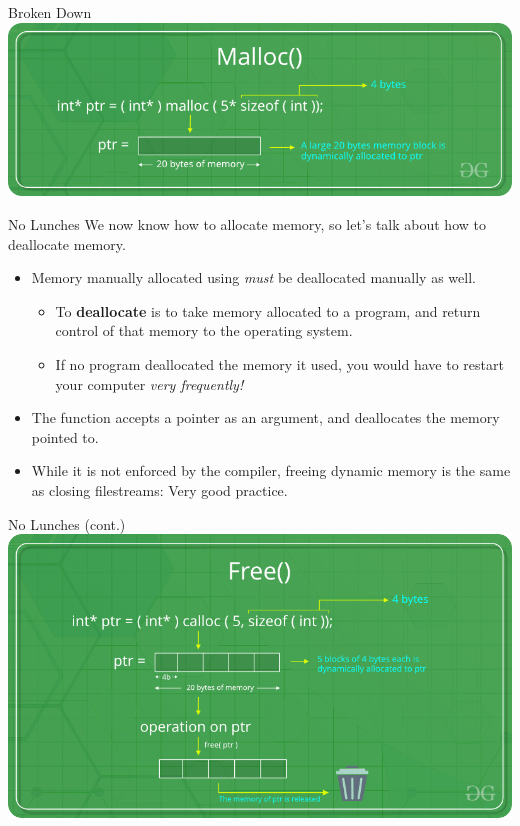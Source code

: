 \documentclass[11pt]{beamer}
\let\OldTexttt\texttt
\renewcommand{\texttt}[1]{\OldTexttt{\color{teal}{#1}}}
\begin{document}
\begin{frame}{\texttt{malloc()} Broken Down}
\center
\includegraphics[scale=0.4]{Malloc-function-in-c.png}
\end{frame}

\begin{frame}{No \texttt{free()} Lunches}
We now know how to allocate memory, so let's talk about how to deallocate memory.
\begin{itemize}
\item Memory manually allocated using \texttt{malloc()} \emph{must} be deallocated manually as well.
\begin{itemize}
	\item To \textbf{deallocate} is to take memory allocated to a program, and return control of that memory to the operating system.  
	\item If no program deallocated the memory it used, you would have to restart your computer \emph{very frequently!}
\end{itemize}
\item The \texttt{free()} function accepts a pointer as an argument, and deallocates the memory pointed to.
\item While it is not enforced by the compiler, freeing dynamic memory is the same as closing filestreams: Very good practice.  
\end{itemize}
\end{frame}

\begin{frame}{No \texttt{free()} Lunches (cont.)}
\center
\includegraphics[scale=0.35]{Free-function-in-c.png}
\end{frame}
\end{document}
